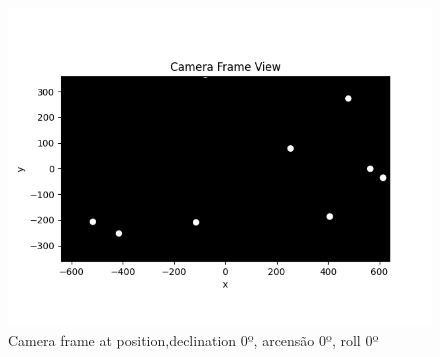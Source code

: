 \begin{figure}[h]
    \centering
    \includegraphics[width=\textwidth]{images/resultado_simulacao.png}
    \caption{Camera frame at position,declination 0º, arcensão 0º, roll 0º}
    \label{fig:resultado_simulacao}
\end{figure}